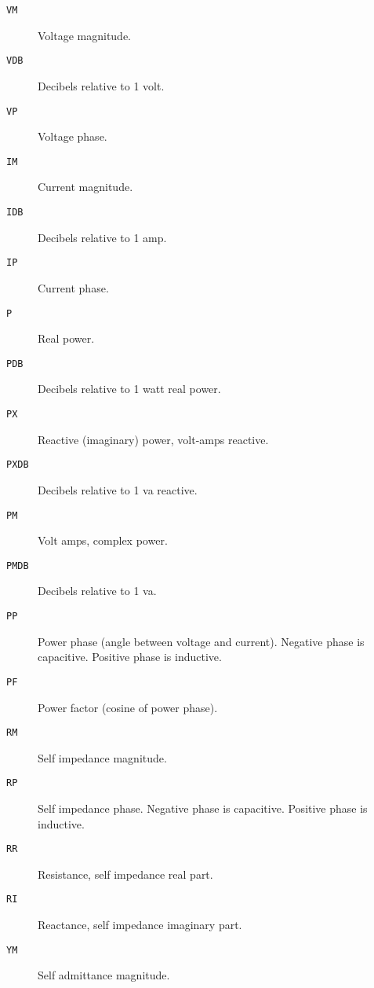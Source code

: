 \begin{description}

\item[{\tt VM}] Voltage magnitude.

\item[{\tt VDB}] Decibels relative to 1 volt.

\item[{\tt VP}] Voltage phase.

\item[{\tt IM}] Current magnitude.

\item[{\tt IDB}] Decibels relative to 1 amp.

\item[{\tt IP}] Current phase.

\item[{\tt P}] Real power.

\item[{\tt PDB}] Decibels relative to 1 watt real power.

\item[{\tt PX}] Reactive (imaginary) power, volt-amps reactive.

\item[{\tt PXDB}] Decibels relative to 1 va reactive.

\item[{\tt PM}] Volt amps, complex power.

\item[{\tt PMDB}] Decibels relative to 1 va.

\item[{\tt PP}] Power phase (angle between voltage and current).  
Negative phase is capacitive.  Positive phase is inductive.

\item[{\tt PF}] Power factor (cosine of power phase).

\item[{\tt RM}] Self impedance magnitude.

\item[{\tt RP}] Self impedance phase.
Negative phase is capacitive.  Positive phase is inductive.

\item[{\tt RR}] Resistance, self impedance real part.

\item[{\tt RI}] Reactance, self impedance imaginary part.

\item[{\tt YM}] Self admittance magnitude.


\end{description}
